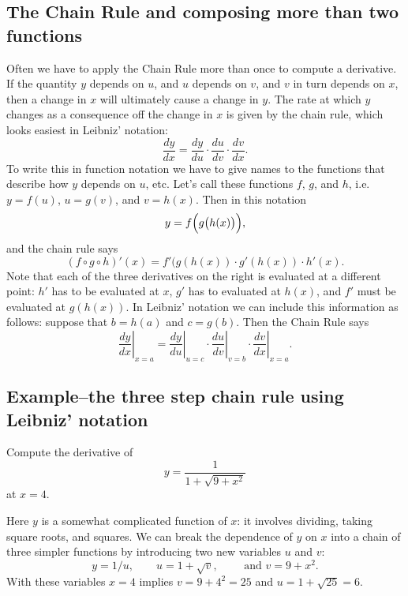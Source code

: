 \subsection{The Chain Rule and composing more than two functions} 
\label{sec:chain-rule-several-functions}
Often we have to apply the Chain Rule more than once to compute a derivative.  If the quantity $y$ depends on $u$, and $u$ depends on $v$, and $v$ in turn depends on $x$, then a change in $x$ will ultimately cause a change in $y$.  The rate at which $y$ changes as a consequence off the change in $x$ is given by the chain rule, which looks easiest in Leibniz' notation:%
\[
\frac{dy}{dx}=\frac{dy}{du}\cdot \frac{du}{dv}\cdot \frac{dv}{dx}.
\]
To write this in function notation we have to give names to the functions that describe how $y$ depends on $u$, etc.  Let's call these functions $f$, $g$, and $h$, i.e.~$y=f(u)$, $u=g(v)$, and $v=h(x)$.  Then in this notation
\[
y = f\Bigl(g\bigl(h(x)\bigr)\Bigr),
\]
and the chain rule says
\[
(f \circ g\circ h)'(x)=f'(g(h(x))\cdot g'(h(x))\cdot h'(x).
\]
Note that each of the three derivatives on the right is evaluated at a different point: $h'$ has to be evaluated at $x$, $g'$ has to evaluated at $h(x)$, and $f'$ must be evaluated at $g(h(x))$.  In Leibniz' notation we can include this information as follows: suppose that $b=h(a)$ and $c=g(b)$.  Then the Chain Rule says
\[
\left.\frac{dy}{dx}\right|_{x=a}=
\left.\frac{dy}{du}\right|_{u=c}\cdot
\left.\frac{du}{dv}\right|_{v=b}\cdot
\left.\frac{dv}{dx}\right|_{x=a}.
\]
\subsection{Example--the three step chain rule using Leibniz' notation}
\label{ex:three-step-chain-rule}
Compute the derivative of 
\[
 y=\frac1{1+\sqrt{9+x^2}}
\]
at $x=4$.

Here $y$ is a somewhat complicated function of $x$: it involves dividing, taking square roots, and squares.  We can break the dependence of $y$ on $x$ into a chain of three simpler functions by introducing two new variables $u$ and $v$:
\[
y=1/u, \qquad
u=1+\sqrt{v}, \qquad
\text{ and }v=9+x^2.
\]
With these variables $x=4$ implies $v = 9 + 4^2 = 25$ and $u=1+\sqrt{25} = 6$.

